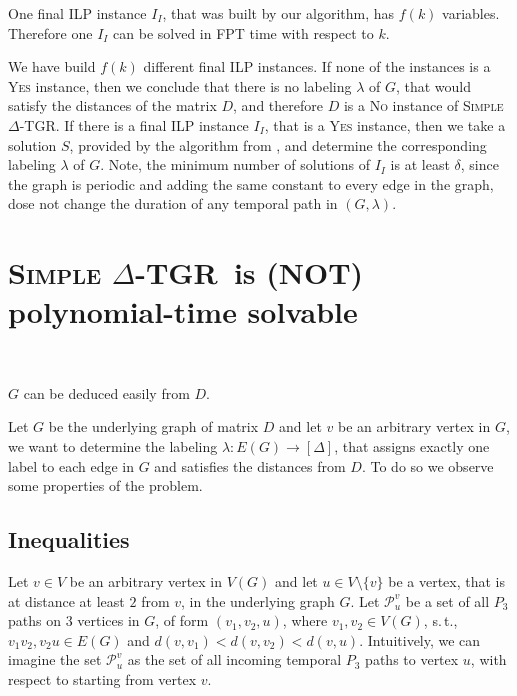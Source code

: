 \documentclass[11pt,a4paper]{article}
\theoremstyle{remark}
\theoremstyle{definition}
\newcommand{\st}{s.\,t.,\ }
\newcommand{\deltaExact}{\textsc{Simple $\Delta$-TGR}}
\begin{document}
One final ILP instance $I_I$, that was built by our algorithm, has $f(k)$ variables. 
Therefore one $I_I$ can be solved in FPT time with respect to $k$.

We have build $f(k)$ different final ILP instances. If none of the instances is a \textsc{Yes} instance, then we conclude that there is no labeling $\lambda$ of $G$, that would satisfy the distances of the matrix $D$,
and therefore $D$ is a \textsc{No} instance of \deltaExact.
If there is a final ILP instance $I_I$, that is a \textsc{Yes} instance, then we take a solution $S$, provided by the algorithm from \cite{Lenstra1983Integer}, and determine the corresponding labeling $\lambda$ of $G$.
Note, the minimum number of solutions of $I_I$ is at least $\delta$, since the graph is periodic and adding the same constant to every edge in the graph, dose not change the duration of any temporal path in $(G, \lambda)$.

\section{
\texorpdfstring{\deltaExact\ is (NOT) polynomial-time solvable}
{\textsc{Simple Delta-TGR} is polynomial-time solvable}
}\

$G$ can be deduced easily from $D$.

	Let $G$ be the underlying graph of matrix $D$ and let $v$ be an arbitrary vertex in $G$, we want to determine the labeling $\lambda: E(G) \rightarrow [\Delta]$, that assigns exactly one label to each edge in $G$ and satisfies the distances from $D$.
	To do so we observe some properties of the problem.
	
\subsection*{Inequalities}
	
	Let $v \in V$ be an arbitrary vertex in $V(G)$ and let $u \in V \setminus \{v\}$ be a vertex, that is at distance at least $2$ from $v$, in the underlying graph $G$.
	Let $\mathcal{P}_{u}^v$ be a set of all $P_3$ paths on $3$ vertices in $G$, of form $(v_1, v_2, u)$, where $v_1, v_2 \in V(G)$, \st $v_1 v_2, v_2 u \in E(G)$ and $d(v,v_1) < d(v,v_2) < d(v,u)$. 
	Intuitively, we can imagine the set $\mathcal{P}_{u}^v$ as the set of all incoming temporal $P_3$ paths to vertex $u$, with respect to starting from vertex $v$.
	
\end{document}
